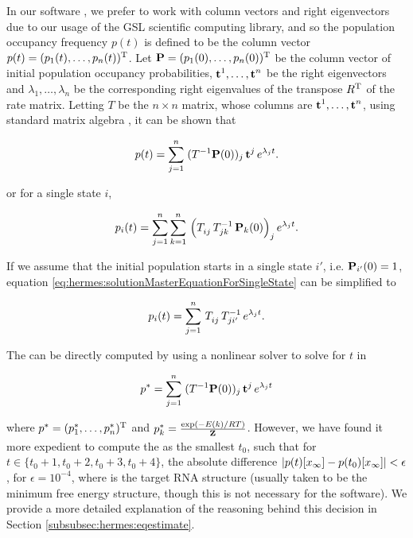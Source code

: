 In our software \hermes, we prefer to work with column vectors and
right eigenvectors due to our usage of the GSL scientific computing library,
and so the population occupancy frequency
$p(t)$ is defined to be the column vector
$p(t)=(p_1(t),\dots,p_n(t))^{\text T}$. Let
$\mbox{\bf P} = (p_1(0),\dots,p_n(0))^{\text T}$ be the column vector of initial
population occupancy probabilities,
$\mbox{\bf t}^1,\dots,\mbox{\bf t}^n$ be the right eigenvectors and
$\lambda_1,\dots,\lambda_n$ be the corresponding right eigenvalues of the
transpose $R^{\text T}$ of the rate matrix.
Letting $T$ be the $n\times n$ matrix, whose columns are
$\mbox{\bf t}^1,\dots,\mbox{\bf t}^n$, using standard matrix algebra
\cite{matrixtheory}, it can be shown that

\begin{align}
\label{eq:hermes:solutionMasterEquation}
p(t) = \sum_{j=1}^n\; (T^{-1}
\mathbbP(0))_j\, \mathbbt^j\, e^{\lambda_j t}.
\end{align}

or for a single state $i$,

\begin{align}
\label{eq:hermes:solutionMasterEquationForSingleState}
p_i(t) = \sum_{j=1}^n \sum_{k=1}^n\, \left(
T_{ij}^{\vphantom{-1}}\, T_{jk}^{-1}\, \mathbbP_k(0)
\right)_j e^{\lambda_j t}.
\end{align}

If we assume that the initial population starts in a single state $i'$,
i.e. $\mbox{\bf P}_{i'}(0) = 1$, equation
\ref{eq:hermes:solutionMasterEquationForSingleState} can be simplified to

\begin{align}
\label{eq:hermes:solutionMasterEquationForSingleStateFixedStartPop}
p_i(t) = \sum_{j=1}^n\, T_{ij}^{\vphantom{-1}}\, T_{ji'}^{-1}\, e^{\lambda_j t}.
\end{align}

The {\em \eqt} can be directly computed by using a
nonlinear solver to solve for $t$ in

\begin{align}
\label{eq:hermes:solutionEquilibriumTime}
\pSt = \sum_{j=1}^n\; (T^{-1}
\mathbbP(0))_j\, \mathbbt^j\, e^{\lambda_j t}
\end{align}

where $p^*=(p^*_1,\dots,p^*_n)^{\text T}$ and $p^*_k = \frac{\exp(-E(k)/RT)}{{\bf Z}^{}_{}}$.
However, we have found it more
expedient to compute the {\em \eqt} as the smallest $t_0$,
such that for $t \in \{t_0+1,t_0+2,t_0+3,t_0+4\}$, the absolute difference
$|p(t)[x_\infty] - p(t_0)[x_\infty]| < \epsilon$, for $\epsilon =
10^{-4}$, where \xEnd is the target RNA structure (usually taken
to be the minimum free energy structure, though this is not necessary for
the software). We provide a more detailed explanation of the reasoning behind
this decision in Section \ref{subsubsec:hermes:eqestimate}.

